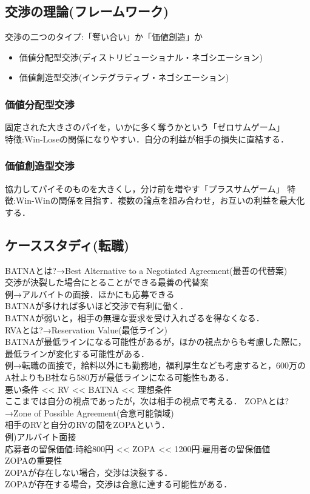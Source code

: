 \documentclass[a4paper,11pt]{ltjsarticle}
\begin{document}
\subsection{交渉の理論(フレームワーク)}
交渉の二つのタイプ:「奪い合い」か「価値創造」か
\begin{itemize}
  \item 価値分配型交渉(ディストリビューショナル・ネゴシエーション)
  \item 価値創造型交渉(インテグラティブ・ネゴシエーション)
\end{itemize}
\subsubsection{価値分配型交渉}
固定された大きさのパイを，いかに多く奪うかという「ゼロサムゲーム」\\
特徴:Win-Loseの関係になりやすい．自分の利益が相手の損失に直結する．
\subsubsection{価値創造型交渉}
協力してパイそのものを大きくし，分け前を増やす「プラスサムゲーム」
特徴:Win-Winの関係を目指す．複数の論点を組み合わせ，お互いの利益を最大化する．
\subsection{ケーススタディ(転職)}
BATNAとは?→Best Alternative to a Negotiated Agreement(最善の代替案)\\
交渉が決裂した場合にとることができる最善の代替案\\
例→アルバイトの面接．ほかにも応募できる\\
BATNAが多ければ多いほど交渉で有利に働く．\\
BATNAが弱いと，相手の無理な要求を受け入れざるを得なくなる．\\
RVAとは?→Reservation Value(最低ライン)\\
BATNAが最低ラインになる可能性があるが，ほかの視点からも考慮した際に，
最低ラインが変化する可能性がある．\\
例→転職の面接で，給料以外にも勤務地，福利厚生なども考慮すると，600万のA社よりもB社なら580万が最低ラインになる可能性もある．\\
悪い条件 << RV << BATNA << 理想条件\\
ここまでは自分の視点であったが，次は相手の視点で考える．
ZOPAとは?→Zone of Possible Agreement(合意可能領域)\\
相手のRVと自分のRVの間をZOPAという．\\
例)アルバイト面接\\
応募者の留保価値:時給800円 << ZOPA << 1200円:雇用者の留保価値\\
ZOPAの重要性\\
ZOPAが存在しない場合，交渉は決裂する．\\
ZOPAが存在する場合，交渉は合意に達する可能性がある．\\
\end{document}
